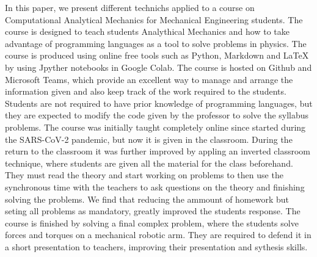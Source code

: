 In this paper, we present different technichs applied to a course on Computational Analytical Mechanics for Mechanical Engineering students. The course is designed to teach students Analythical Mechanics and how to take advantage of programming languages as a tool to solve problems in physics. The course is produced using online free tools such as Python, Markdown and LaTeX by using Jpyther notebooks in Google Colab. The course is hosted on Github and Microsoft Teams, which provide an excellent way to manage and arrange the information given and also keep track of the work required to the students. 
Students are not required to have prior knowledge of programming languages, but they are expected to modify the code given by the professor to solve the syllabus problems. The course was initially taught completely online since started during the SARS-CoV-2 pandemic, but now it is given in the classroom. During the return to the classroom it was further improved by appling an inverted classroom technique, where students are given all the material for the class beforehand. They must read the theory and start working on problems to then use the synchronous time with the teachers to ask questions on the theory and finishing solving the problems. We find that reducing the ammount of homework but seting all problems as  mandatory, greatly improved the students response. The course is finished by solving a final complex problem, where the students solve forces and torques on a mechanical robotic arm. They are required to defend it in a short presentation to teachers, improving their presentation and sythesis skills.

